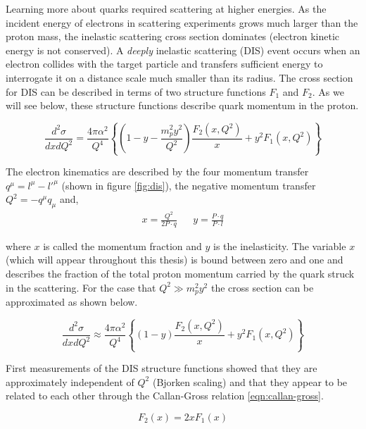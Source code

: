 Learning more about quarks required scattering at higher energies.  As the incident energy of electrons in scattering experiments grows much larger than the proton mass, the inelastic scattering cross section dominates (electron kinetic energy is not conserved).  A \textit{deeply} inelastic scattering (DIS) event occurs when an electron collides with the target particle and transfers sufficient energy to interrogate it on a distance scale much smaller than its radius.  The cross section for DIS can be described in terms of two structure functions $F_1$ and $F_2$.  As we will see below, these structure functions describe quark momentum in the proton.

\begin{equation}
	\label{eqn:sfs}
	\frac{d^2\sigma}{dx dQ^2} = \frac{4 \pi \alpha^2}{Q^4} \left\lbrace \left( 1 - y - \frac{m_p^2 y^2}{Q^2} \right) \frac{F_2(x,Q^2)}{x} + y^2 F_1 (x,Q^2) \right\rbrace
\end{equation}

The electron kinematics are described by the four momentum transfer $q^{\mu} = l^{\mu} - l'^{\mu}$ (shown in figure \ref{fig:dis}), the negative momentum transfer $Q^2 = - q^{\mu} q_{\mu}$ and,
\begin{align}  
  x = \frac{Q^{2}}{2P \cdot q} && y = \frac{P \cdot q}{P \cdot l} 
\end{align}

where $x$ is called the momentum fraction and $y$ is the inelasticity.  The variable $x$ (which will appear throughout this thesis) is bound between zero and one and describes the fraction of the total proton momentum carried by the quark struck in the scattering.  For the case that $Q^2 \gg m_p^2 y^2$ the cross section can be approximated as shown below.

\begin{equation}
	\label{eqn:sfs2}
	\frac{d^2\sigma}{dx dQ^2} \approx \frac{4 \pi \alpha^2}{Q^4} \left\lbrace \left( 1 - y \right) \frac{F_2(x,Q^2)}{x} + y^2 F_1 (x,Q^2) \right\rbrace
\end{equation}

First measurements of the DIS structure functions \cite{history-bjorken:1969} showed that they are approximately independent of $Q^2$ (Bjorken scaling) and that they appear to be related to each other through the Callan-Gross relation \ref{eqn:callan-gross}.

\begin{equation}	
	F_{2} (x) = 2xF_1 (x)
	\label{eqn:callan-gross}
\end{equation}

